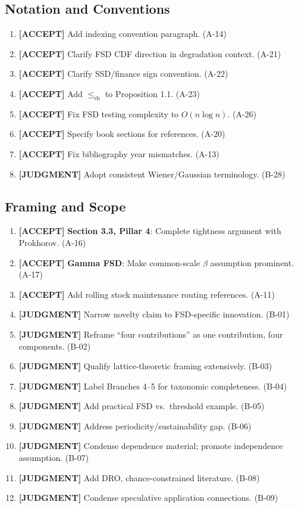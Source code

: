 \documentclass[11pt,a4paper]{article}
\newcommand{\acceptlabel}{\textbf{\textcolor{acceptgreen}{[ACCEPT]}}}
\newcommand{\judgmentlabel}{\textbf{\textcolor{judgmentorange}{[JUDGMENT]}}}
\begin{document}
\subsection{Notation and Conventions}

\begin{enumerate}[label=\arabic*.,leftmargin=2em]
  \item \acceptlabel{} Add indexing convention paragraph. (A-14)
  \item \acceptlabel{} Clarify FSD CDF direction in degradation context. (A-21)
  \item \acceptlabel{} Clarify SSD/finance sign convention. (A-22)
  \item \acceptlabel{} Add $\le_{\mathrm{rh}}$ to Proposition 1.1. (A-23)
  \item \acceptlabel{} Fix FSD testing complexity to $O(n\log n)$. (A-26)
  \item \acceptlabel{} Specify book sections for references. (A-20)
  \item \acceptlabel{} Fix bibliography year mismatches. (A-13)
  \item \judgmentlabel{} Adopt consistent Wiener/Gaussian terminology. (B-28)
\end{enumerate}

\subsection{Framing and Scope}

\begin{enumerate}[label=\arabic*.,leftmargin=2em]
  \item \acceptlabel{} \textbf{Section 3.3, Pillar 4}: Complete tightness argument with Prokhorov. (A-16)
  \item \acceptlabel{} \textbf{Gamma FSD}: Make common-scale $\beta$ assumption prominent. (A-17)
  \item \acceptlabel{} Add rolling stock maintenance routing references. (A-11)
  \item \judgmentlabel{} Narrow novelty claim to FSD-specific innovation. (B-01)
  \item \judgmentlabel{} Reframe ``four contributions'' as one contribution, four components. (B-02)
  \item \judgmentlabel{} Qualify lattice-theoretic framing extensively. (B-03)
  \item \judgmentlabel{} Label Branches 4--5 for taxonomic completeness. (B-04)
  \item \judgmentlabel{} Add practical FSD vs.\ threshold example. (B-05)
  \item \judgmentlabel{} Address periodicity/sustainability gap. (B-06)
  \item \judgmentlabel{} Condense dependence material; promote independence assumption. (B-07)
  \item \judgmentlabel{} Add DRO, chance-constrained literature. (B-08)
  \item \judgmentlabel{} Condense speculative application connections. (B-09)
\end{enumerate}
\end{document}
